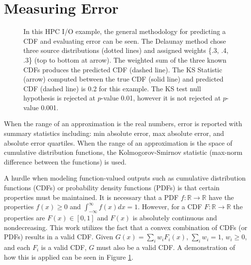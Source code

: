 \documentclass[smallextended,final]{svjour3}       %
\begin{document}
\section{Measuring Error}
\label{sec:error}

\begin{figure}[htb]
  \centering
  \vspace{-0.3cm}
  \caption{In this HPC I/O example, the general methodology for predicting a CDF and evaluating error can be seen. The Delaunay method chose three source distributions (dotted lines) and assigned weights \{.3, .4, .3\} (top to bottom at arrow). The weighted sum of the three known CDFs produces the predicted CDF (dashed line). The KS Statistic (arrow) computed between the true CDF (solid line) and predicted CDF (dashed line) is 0.2 for this example. The KS test null hypothesis is rejected at $p$-value 0.01, however it is not rejected at $p$-value 0.001.
  \vspace{-.1cm}}
  \label{fig:prediction-example}
\end{figure}

When the range of an approximation is the real numbers, error is reported with summary statistics including: min absolute error, max absolute error, and absolute error quartiles. When the range of an approximation is the space of cumulative distribution functions, the Kolmogorov-Smirnov statistic (max-norm difference between the functions) is used.

A hurdle when modeling function-valued outputs such as cumulative distribution functions (CDFs) or probability density functions (PDFs) is that certain properties must be maintained. It is necessary that a PDF $f: \mathbb{R} \rightarrow \mathbb{R}$ have the properties $f(x) \geq 0$ and $\int_{-\infty}^{\infty}f(x)dx = 1$. However, for a CDF $F: \mathbb{R} \rightarrow \mathbb{R}$ the properties are $F(x) \in [0,1]$ and $F(x)$ is absolutely continuous and nondecreasing. This work utilizes the fact that a convex combination of CDFs (or PDFs) results in a valid CDF. Given $G(x) = \sum_{i}w_i F_i(x)$, $\sum_{i} w_i = 1$, $w_i \geq 0$, and each $F_i$ is a valid CDF, $G$ must also be a valid CDF. A demonstration of how this is applied can be seen in Figure \ref{fig:prediction-example}.
\end{document}
